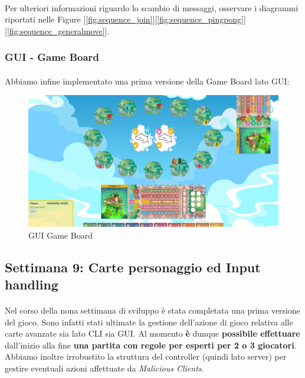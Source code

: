 \documentclass[a4paper, 12pt]{article}
\begin{document}
	\paragraph{}
	Per ulteriori informazioni riguardo lo scambio di messaggi, osservare i diagrammi riportati nelle Figure [\ref{fig:sequence_join}][\ref{fig:sequence_pingpong}][\ref{fig:sequence_generalmove}].
	\subsubsection{GUI - Game Board}
	\paragraph{}
	Abbiamo infine implementato una prima versione della Game Board lato GUI:\\
	\begin{figure}[h!]
		\centering
		\includegraphics[scale=0.2]{guiGameBoard.png}
		\caption{GUI Game Board}
	\end{figure}
	
	\newpage
	\subsection{Settimana 9: Carte personaggio ed Input handling}
	\paragraph{}
	Nel corso della nona settimana di sviluppo è stata completata una prima versione del gioco. Sono infatti stati ultimate la gestione dell'azione di gioco relativa alle carte avanzate sia lato CLI sia GUI. Al momento \textbf{è} dunque \textbf{possibile effettuare} dall'inizio alla fine \textbf{una partita con regole per esperti per 2 o 3 giocatori}.\\
	Abbiamo inoltre irrobustito la struttura del controller (quindi lato server) per gestire eventuali azioni affettuate da \textit{Malicious Clients}.
\end{document}
